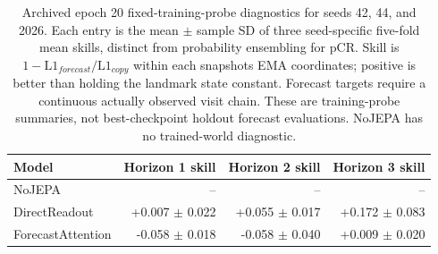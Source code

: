 \begin{table}[t]
\centering
\small
\caption{Archived epoch 20 fixed-training-probe diagnostics for seeds 42, 44, and 2026. Each entry is the mean $\pm$ sample SD of three seed-specific five-fold mean skills, distinct from probability ensembling for pCR. Skill is $1-\mathrm{L1}_{forecast}/\mathrm{L1}_{copy}$ within each snapshot\textquotesingle s EMA coordinates; positive is better than holding the landmark state constant. Forecast targets require a continuous actually observed visit chain. These are training-probe summaries, not best-checkpoint holdout forecast evaluations. NoJEPA has no trained-world diagnostic.}
\label{tab:worldprobe}
\begin{tabular}{lrrr}
\toprule
Model & Horizon 1 skill & Horizon 2 skill & Horizon 3 skill \\
\midrule
NoJEPA & -- & -- & -- \\
DirectReadout & +0.007 $\pm$ 0.022 & +0.055 $\pm$ 0.017 & +0.172 $\pm$ 0.083 \\
ForecastAttention & -0.058 $\pm$ 0.018 & -0.058 $\pm$ 0.040 & +0.009 $\pm$ 0.020 \\
\bottomrule
\end{tabular}
\end{table}
